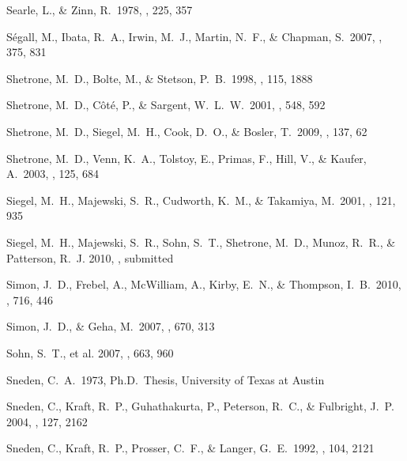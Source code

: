 \documentclass{emulateapj}
\begin{document}
\begin{thebibliography}{}

 Searle, L., \& Zinn, R.\ 1978,
  \apj, 225, 357

 S{\'e}gall, M., Ibata, R.~A.,
  Irwin, M.~J., Martin, N.~F., \& Chapman, S.\ 2007, \mnras, 375, 831

  Shetrone, M.~D., Bolte, M., \& Stetson, P.~B.\ 1998, \aj, 115, 1888

 Shetrone, M.~D., C{\^o}t{\'e}, P., \& Sargent,
  W.~L.~W.\ 2001, \apj, 548, 592


 Shetrone, M.~D., Siegel, M.~H.,
  Cook, D.~O., \& Bosler, T.\ 2009, \aj, 137, 62

 Shetrone, M.~D., Venn, K.~A.,
  Tolstoy, E., Primas, F., Hill, V., \& Kaufer, A.\ 2003, \aj, 125,
  684

 Siegel, M.~H., Majewski, S.~R.,
  Cudworth, K.~M., \& Takamiya, M.\ 2001, \aj, 121, 935

 Siegel, M.~H., Majewski, S.~R.,
  Sohn, S.~T., Shetrone, M.~D., Munoz, R.~R., \& Patterson,
  R.~J. 2010, \apj, submitted

 Simon, J.~D., Frebel, A.,
  McWilliam, A., Kirby, E.~N., \& Thompson, I.~B.\ 2010, \apj, 716,
  446

 Simon, J.~D., \& Geha, M.\ 2007,
  \apj, 670, 313

 Sohn, S.~T., et al. 2007, \apj,
  663, 960

 Sneden, C.~A.\ 1973, Ph.D.~Thesis,
  University of Texas at Austin

 Sneden, C., Kraft, R.~P.,
  Guhathakurta, P., Peterson, R.~C., \& Fulbright, J.~P. 2004, \aj,
  127, 2162

 Sneden, C., Kraft, R.~P.,
  Prosser, C.~F., \& Langer, G.~E.\ 1992, \aj, 104, 2121


\end{thebibliography}
\end{document}

